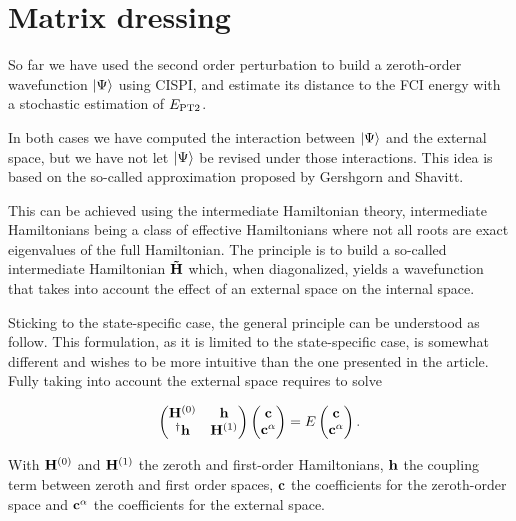 \documentclass[./thesis.tex]{subfiles}
\begin{document}
\section{Matrix dressing}

So far we have used the second order perturbation to build a zeroth-order wavefunction $\ket \Psi$ using CISPI, and estimate its distance to the FCI energy with a stochastic estimation of $E_\text{PT2}$.

In both cases we have computed the interaction between $\ket \Psi$ and the external space, but we have not let $\ket \Psi$ be revised under those interactions. This idea is based on the so-called \Bk approximation proposed by Gershgorn and Shavitt.\cite{Gershgorn_1968}

This can be achieved using the intermediate Hamiltonian theory,\cite{0305-4470-18-5-014} intermediate Hamiltonians being a class of effective Hamiltonians\cite{lindgren1982atomic} where not all roots are exact eigenvalues of the full Hamiltonian.
The principle is to build a so-called intermediate Hamiltonian ${\bf \tilde H}$ which, when diagonalized, yields a wavefunction that takes into account the effect of an external space on the internal space. 


Sticking to the state-specific case, the general principle can be understood as follow. This formulation, as it is limited to the state-specific case, is somewhat different and wishes to be more intuitive than the one presented in the article.
Fully taking into account the external space requires to solve 

\newcommand{\Hzero}{{\bf H}^{(0)}}
\newcommand{\hcpl}{{\bf h}}

\begin{equation}
\begin{pmatrix}
\Hzero &  \hcpl\\ 
^\dagger\hcpl & {\bf H}^{(1)}
\end{pmatrix} \begin{pmatrix}
{\bf c}\\ 
{\bf c}^\alpha
\end{pmatrix}=E\begin{pmatrix}
{\bf c}\\ 
{\bf c}^\alpha
\end{pmatrix}.
\end{equation}

With ${\bf H}^{(0)}$ and ${\bf H}^{(1)}$ the zeroth and first-order Hamiltonians, $\bf h$ the coupling term between zeroth and first order spaces, ${\bf c}$ the coefficients for the zeroth-order space and ${\bf c}^\alpha$ the coefficients for the external space.
\end{document}
